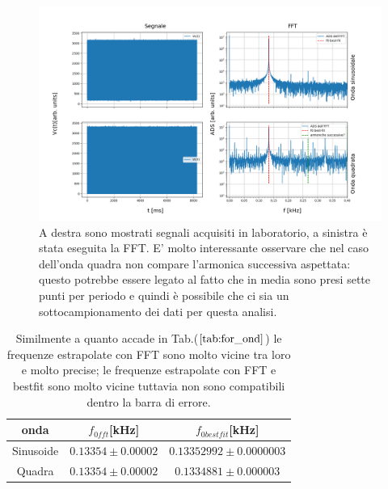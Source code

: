 \documentclass{article}
\begin{document}
         \begin{figure}[H]
            \centering
            \includegraphics[width=\textwidth]{FFT5/FFTwaveforms3.png}
            \caption{A destra sono mostrati segnali acquisiti in laboratorio, a sinistra 
                    è stata eseguita la FFT.
                    E' molto interessante osservare che nel caso dell'onda quadra 
                    non compare l'armonica successiva aspettata: questo potrebbe essere 
                    legato al fatto che in media sono presi sette punti per periodo e quindi 
                    è possibile che ci sia un sottocampionamento dei dati per questa analisi.}
            \label{fig:for_lun}
        \end{figure}    


         \begin{table}[H]
            \centering
            \caption{}
                \begin{tabular}{ccc}
                    onda            &   $f_{0fft}$[kHz]                     & $f_{0bestfit}$[kHz] \\
                    \hline
                    Sinusoide       &   $0.13354 \pm 0.00002$           & $0.13352992 \pm 0.0000003$ \\
                    Quadra          &   $0.13354 \pm 0.00002$           & $0.1334881 \pm  0.000003$ \\
                \end{tabular}
                \caption{Similmente a quanto accade in Tab.($\ref{tab:for_ond}$) le 
                frequenze estrapolate con FFT sono molto vicine tra loro e molto precise;
                le frequenze estrapolate con FFT e bestfit sono molto vicine tuttavia non 
                sono compatibili dentro la barra di errore.}
                \label{tab:for_lun}
        \end{table}
        
\end{document}
